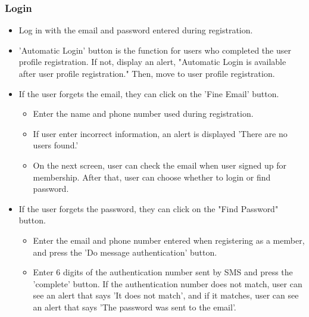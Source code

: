 \documentclass[conference]{IEEEtran}
\begin{document}
\subsubsection{Login}
\begin{itemize}
    \begin{itemize}
        \item Log in with the email and password entered during registration.
        \item 'Automatic Login' button is the function for users who completed the user profile registration. If not, display an alert, "Automatic Login is available after user profile registration." Then, move to user profile registration.
        \item If the user forgets the email, they can click on the 'Fine Email' button.
        \begin{itemize}
            \item Enter the name and phone number used during registration.
            \item If user enter incorrect information, an alert is displayed 'There are no users found.'
            \item On the next screen, user can check the email when user signed up for membership. After that, user can choose whether to login or find password.
        \end{itemize}
        \item If the user forgets the password, they can click on the "Find Password" button.
        \begin{itemize}
            \item Enter the email and phone number entered when registering as a member, and press the 'Do message authentication' button. 
            \item Enter 6 digits of the authentication number sent by SMS and press the 'complete' button. If the authentication number does not match, user can see an alert that says 'It does not match', and if it matches, user can see an alert that says 'The password was sent to the email'.
            \vspace{0.3cm}
        \end{itemize}
    \end{itemize}
\end{itemize}
\end{document}
